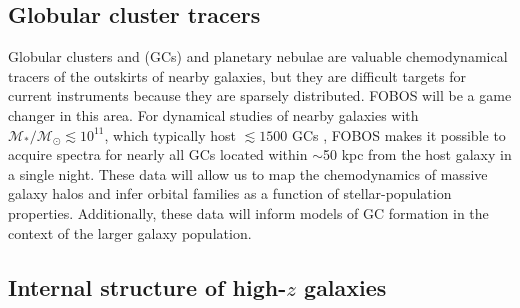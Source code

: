 
\subsection{Globular cluster tracers}

Globular clusters and (GCs) and planetary nebulae are valuable
chemodynamical tracers of the outskirts of nearby galaxies, but they are
difficult targets for current instruments because they are sparsely
distributed. FOBOS will be a game changer in this area. For dynamical
studies of nearby galaxies with $\mathcal{M_\ast/M_\odot} \lesssim
10^{11}$, which typically host $\lesssim1500$ GCs
\citep{2013ApJ...772...82H}, FOBOS makes it possible to acquire
spectra for nearly all GCs located within $\sim$50 kpc from the host
galaxy in a single night. These data will allow us to map the
chemodynamics of massive galaxy halos and infer orbital families as a
function of stellar-population properties. Additionally, these data
will inform models of GC formation in the context of the larger
galaxy population.



\subsection{Internal structure of high-$z$ galaxies}

